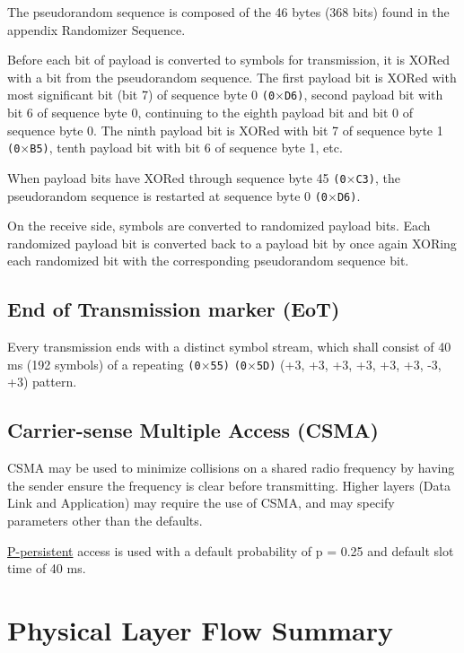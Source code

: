 \documentclass[a4paper,11pt]{book}
\begin{document}
The pseudorandom sequence is composed of the 46 bytes (368 bits) found in the appendix Randomizer Sequence.

Before each bit of payload is converted to symbols for transmission, it is XORed with a bit from the pseudorandom sequence. The first payload bit is XORed with most significant bit (bit 7) of sequence byte 0 \texttt{(0$\times$D6)}, second payload bit with bit 6 of sequence byte 0, continuing to the eighth payload bit and bit 0 of sequence byte 0. The ninth payload bit is XORed with bit 7 of sequence byte 1 \texttt{(0$\times$B5)}, tenth payload bit with bit 6 of sequence byte 1, etc.

When payload bits have XORed through sequence byte 45 \texttt{(0$\times$C3)}, the pseudorandom sequence is restarted at sequence byte 0 \texttt{(0$\times$D6)}.

On the receive side, symbols are converted to randomized payload bits. Each randomized payload bit is converted back to a payload bit by once
again XORing each randomized bit with the corresponding pseudorandom sequence bit.

\subsection{End of Transmission marker (EoT)}

Every transmission ends with a distinct symbol stream, which shall consist of 40 ms (192 symbols) of a repeating \texttt{(0$\times$55)} \texttt{(0$\times$5D)} (+3, +3, +3, +3, +3, +3, -3, +3) pattern.

\subsection{Carrier-sense Multiple Access (CSMA)}

CSMA may be used to minimize collisions on a shared radio frequency by having the sender ensure the frequency is clear before transmitting. Higher layers (Data Link and Application) may require the use of CSMA, and may specify parameters other than the defaults.

\href{https://en.wikipedia.org/wiki/Carrier-sense_multiple_access}{P-persistent} access is used with a default probability of p = 0.25 and default slot time of 40 ms.

\section{Physical Layer Flow Summary}
\end{document}
